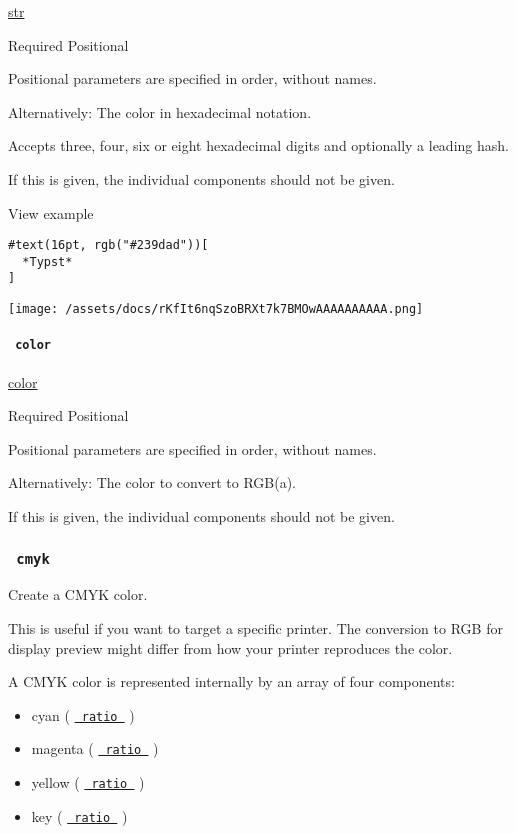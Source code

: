 \href{/docs/reference/foundations/str/}{str}

{Required} {{ Positional }}

\label{definitions-rgb-hex-positional-tooltip}
Positional parameters are specified in order, without names.

Alternatively: The color in hexadecimal notation.

Accepts three, four, six or eight hexadecimal digits and optionally a
leading hash.

If this is given, the individual components should not be given.


View example

\begin{verbatim}
#text(16pt, rgb("#239dad"))[
  *Typst*
]
\end{verbatim}

\texttt{[image: /assets/docs/rKfIt6nqSzoBRXt7k7BMOwAAAAAAAAAA.png]}

\paragraph{\texorpdfstring{\texttt{\ color\ }}{ color }}\label{definitions-rgb-color}

\href{/docs/reference/visualize/color/}{color}

{Required} {{ Positional }}

\label{definitions-rgb-color-positional-tooltip}
Positional parameters are specified in order, without names.

Alternatively: The color to convert to RGB(a).

If this is given, the individual components should not be given.

\subsubsection{\texorpdfstring{\texttt{\ cmyk\ }}{ cmyk }}\label{definitions-cmyk}

Create a CMYK color.

This is useful if you want to target a specific printer. The conversion
to RGB for display preview might differ from how your printer reproduces
the color.

A CMYK color is represented internally by an array of four components:

\begin{itemize}
\tightlist
\item
  cyan ( \href{/docs/reference/layout/ratio/}{\texttt{\ ratio\ }} )
\item
  magenta ( \href{/docs/reference/layout/ratio/}{\texttt{\ ratio\ }} )
\item
  yellow ( \href{/docs/reference/layout/ratio/}{\texttt{\ ratio\ }} )
\item
  key ( \href{/docs/reference/layout/ratio/}{\texttt{\ ratio\ }} )
\end{itemize}

